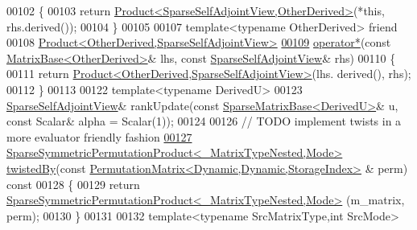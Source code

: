 \begin{DoxyCode}
00102 \textcolor{keyword}{    }\{
00103       \textcolor{keywordflow}{return} \hyperlink{group___core___module_class_eigen_1_1_product}{Product<SparseSelfAdjointView,OtherDerived>}(*\textcolor{keyword}{this}, 
      rhs.derived());
00104     \}
00105 
00107     \textcolor{keyword}{template}<\textcolor{keyword}{typename} OtherDerived> \textcolor{keyword}{friend}
00108     \hyperlink{group___core___module_class_eigen_1_1_product}{Product<OtherDerived,SparseSelfAdjointView>}
\hyperlink{group___sparse_core___module_a346ad7b3c5c8769c0fe29ae9e921b429}{00109}     \hyperlink{group___sparse_core___module_a346ad7b3c5c8769c0fe29ae9e921b429}{operator*}(\textcolor{keyword}{const} \hyperlink{group___core___module_class_eigen_1_1_matrix_base}{MatrixBase<OtherDerived>}& lhs, \textcolor{keyword}{const} 
      \hyperlink{group___sparse_core___module_class_eigen_1_1_sparse_self_adjoint_view}{SparseSelfAdjointView}& rhs)
00110     \{
00111       \textcolor{keywordflow}{return} \hyperlink{group___core___module_class_eigen_1_1_product}{Product<OtherDerived,SparseSelfAdjointView>}(lhs.
      derived(), rhs);
00112     \}
00113 
00122     \textcolor{keyword}{template}<\textcolor{keyword}{typename} DerivedU>
00123     \hyperlink{group___sparse_core___module_class_eigen_1_1_sparse_self_adjoint_view}{SparseSelfAdjointView}& rankUpdate(\textcolor{keyword}{const} 
      \hyperlink{group___sparse_core___module_class_eigen_1_1_sparse_matrix_base}{SparseMatrixBase<DerivedU>}& u, \textcolor{keyword}{const} Scalar& alpha = Scalar(1));
00124     
00126     \textcolor{comment}{// TODO implement twists in a more evaluator friendly fashion}
\hyperlink{group___sparse_core___module_acde15b45cf7b43520e1005ec65d55f3c}{00127}     \hyperlink{class_eigen_1_1_sparse_symmetric_permutation_product}{SparseSymmetricPermutationProduct<\_MatrixTypeNested,Mode>}
       \hyperlink{group___sparse_core___module_acde15b45cf7b43520e1005ec65d55f3c}{twistedBy}(\textcolor{keyword}{const} \hyperlink{group___core___module}{PermutationMatrix<Dynamic,Dynamic,StorageIndex>}
      & perm)\textcolor{keyword}{ const}
00128 \textcolor{keyword}{    }\{
00129       \textcolor{keywordflow}{return} \hyperlink{class_eigen_1_1_sparse_symmetric_permutation_product}{SparseSymmetricPermutationProduct<\_MatrixTypeNested,Mode>}
      (m\_matrix, perm);
00130     \}
00131 
00132     \textcolor{keyword}{template}<\textcolor{keyword}{typename} SrcMatrixType,\textcolor{keywordtype}{int} SrcMode>

\end{DoxyCode}
